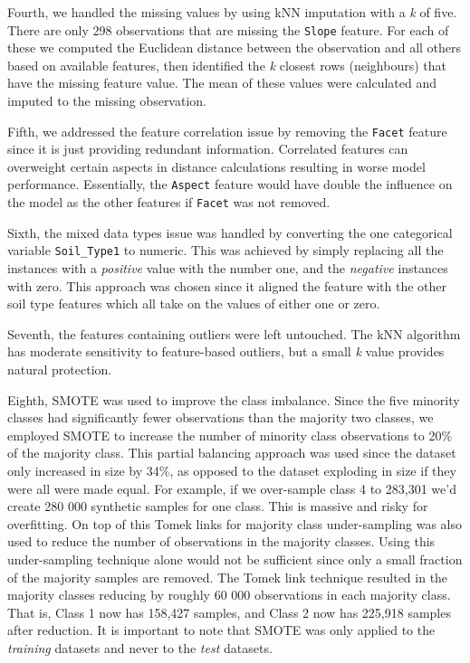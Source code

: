 \documentclass[10pt, conference]{IEEEtran}
\begin{document}
 Fourth, we handled the missing values by using kNN imputation with a \textit{k} of five. There are only 298 observations that are missing the \texttt{Slope} feature. For each of these we computed the Euclidean distance between the observation and all others based on available features, then identified the \textit{k} closest rows (neighbours) that have the missing feature value. The mean of these values were calculated and imputed to the missing observation.
 
 Fifth, we addressed the feature correlation issue by removing the \texttt{Facet} feature since it is just providing redundant information. Correlated features can overweight certain aspects in distance calculations resulting in worse model performance. Essentially, the \texttt{Aspect} feature would have double the influence on the model as the other features if \texttt{Facet} was not removed.
 
 Sixth, the mixed data types issue was handled by converting the one categorical variable \texttt{Soil\_Type1} to numeric. This was achieved by simply replacing all the instances with a \textit{positive} value with the number one, and the \textit{negative} instances with zero. This approach was chosen since it aligned the feature with the other soil type features which all take on the values of either one or zero.
 
 Seventh, the features containing outliers were left untouched. The kNN algorithm has moderate sensitivity to feature-based outliers, but a small \textit{k} value provides natural protection.
 
 Eighth, SMOTE was used to improve the class imbalance. Since the five minority classes had significantly fewer observations than the majority two classes, we employed SMOTE to increase the number of minority class observations to 20\% of the majority class. This partial balancing approach was used since the dataset only increased in size by 34\%, as opposed to the dataset exploding in size if they were all were made equal. For example, if we over-sample class 4 to 283,301 we'd create 280 000 synthetic samples for one class. This is massive and risky for overfitting. On top of this Tomek links for majority class under-sampling was also used to reduce the number of observations in the majority classes. Using this under-sampling technique alone would not be sufficient since only a small fraction of the majority samples are removed. The Tomek link technique resulted in the majority classes reducing by roughly 60 000 observations in each majority class. That is, Class 1 now has 158,427 samples, and Class 2 now has 225,918 samples after reduction.  It is important to note that SMOTE was only applied to the \textit{training} datasets and never to the \textit{test} datasets.
 
\end{document}
